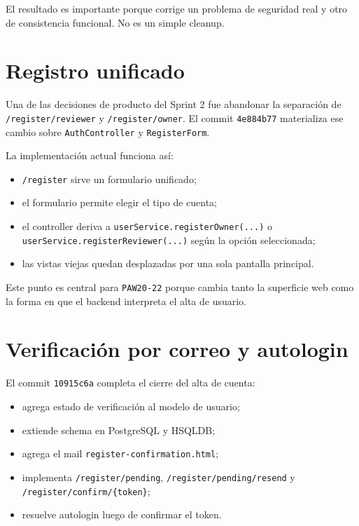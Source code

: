 \documentclass[11pt,a4paper]{report}
\newcommand{\commit}[1]{\texttt{#1}}
\newcommand{\code}[1]{\nolinkurl{#1}}
\newcommand{\story}[1]{\texttt{#1}}
\begin{document}
El resultado es importante porque corrige un problema de seguridad real y otro de consistencia funcional. No es un simple cleanup.

\section{Registro unificado}

Una de las decisiones de producto del Sprint 2 fue abandonar la separaci\'on de \code{/register/reviewer} y \code{/register/owner}. El commit \commit{4e884b77} materializa ese cambio sobre \code{AuthController} y \code{RegisterForm}.

La implementaci\'on actual funciona as\'i:

\begin{itemize}
  \item \code{/register} sirve un formulario unificado;
  \item el formulario permite elegir el tipo de cuenta;
  \item el controller deriva a \code{userService.registerOwner(...)} o \code{userService.registerReviewer(...)} seg\'un la opci\'on seleccionada;
  \item las vistas viejas quedan desplazadas por una sola pantalla principal.
\end{itemize}

Este punto es central para \story{PAW20-22} porque cambia tanto la superficie web como la forma en que el backend interpreta el alta de usuario.

\section{Verificaci\'on por correo y autologin}

El commit \commit{10915c6a} completa el cierre del alta de cuenta:

\begin{itemize}
  \item agrega estado de verificaci\'on al modelo de usuario;
  \item extiende schema en PostgreSQL y HSQLDB;
  \item agrega el mail \code{register-confirmation.html};
  \item implementa \code{/register/pending}, \code{/register/pending/resend} y \code{/register/confirm/\{token\}};
  \item resuelve autologin luego de confirmar el token.
\end{itemize}
\end{document}
